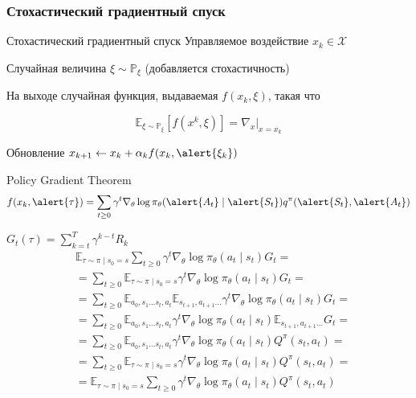 \documentclass[notheorems]{beamer} %
\begin{document}
\begin{frame}
	\frametitle{Стохастический градиентный спуск}
	
	\begin{block}{Стохастический градиентный спуск}
		Управляемое воздействие  $x_k \in \mathcal{X}$
		
		Случайная величина $\xi \sim \mathbb{P}_\xi$ (добавляется стохастичность)
		
		На выходе случайная функция, выдаваемая  $f(x_k, \xi)$, такая что
		
		$$ \mathbb{E}_{\xi \sim \mathbb{P}_\xi}[ f(x^k, \xi) ] = \nabla_x|_{x=x_k} $$
		
		
		Обновление $ x_{k+1} \leftarrow x_k  +\alpha_k f(x_k, \alert{\xi_k}) $
	\end{block}

	\begin{block}{Policy Gradient Theorem}
		$$ f(x_k, \alert{\tau})= \sum_{t \ge 0} \gamma^t \nabla_{\theta} \log \pi_\theta (\alert{A_t} \mid \alert{S_t}) q^{\pi}(\alert{S_t}, \alert{A_t}) $$
	\end{block}
\end{frame}

\begin{frame}
	$G_t(\tau )= \sum_{k = t}^{T} \gamma^{k - t} R_{k}$
	\begin{align*}
	 & \mathbb{E}_{\tau \sim \pi \mid s_0 = s} \sum_{t \ge 0} \gamma^t \nabla_{\theta} \log \pi_\theta (a_t \mid s_t) G_t = \\
	&= \sum_{t \ge 0} \mathbb{E}_{\tau \sim \pi \mid s_0 = s} \gamma^t \nabla_{\theta} \log \pi_\theta (a_t \mid s_t) G_t = \\
	&= \sum_{t \ge 0} \mathbb{E}_{a_0, s_1 \dots s_t, a_t} \mathbb{E}_{s_{t+1}, a_{t+1} \dots} \gamma^t \nabla_{\theta} \log \pi_\theta (a_t \mid s_t) G_t = \\
	&= \sum_{t \ge 0} \mathbb{E}_{a_0, s_1 \dots s_t, a_t} \gamma^t \nabla_{\theta} \log \pi_\theta (a_t \mid s_t)  \mathbb{E}_{s_{t+1}, a_{t+1} \dots} G_t = \\
	&= \sum_{t \ge 0} \mathbb{E}_{a_0, s_1 \dots s_t, a_t} \gamma^t \nabla_{\theta} \log \pi_\theta (a_t \mid s_t) Q^\pi(s_t, a_t) = \\
	&= \sum_{t \ge 0} \mathbb{E}_{\tau \sim \pi \mid s_0 = s} \gamma^t \nabla_{\theta} \log \pi_\theta (a_t \mid s_t) Q^\pi(s_t, a_t) = \\
	&= \mathbb{E}_{\tau \sim \pi \mid s_0 = s} \sum_{t \ge 0} \gamma^t \nabla_{\theta} \log \pi_\theta (a_t \mid s_t) Q^\pi(s_t, a_t)  
	\end{align*}
\end{frame}	
\end{document}
